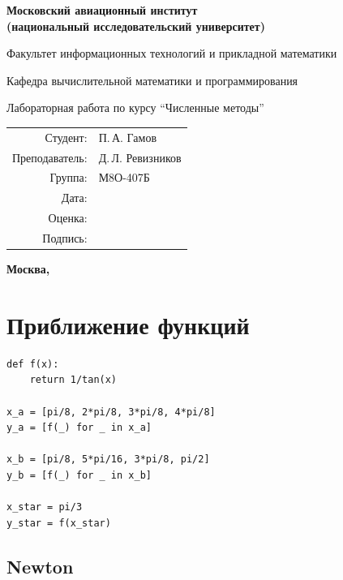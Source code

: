 \documentclass[pdf, unicode, 12pt, a4paper,oneside,fleqn]{article}
\begin{document}
\begin{titlepage}
\begin{center}
\bfseries
{\Large Московский авиационный институт\\ (национальный исследовательский университет)}

\vspace{48pt}
{\large Факультет информационных технологий и прикладной математики}

\vspace{36pt}
{\large Кафедра вычислительной математики и программирования}

\vspace{48pt}Лабораторная работа  по курсу 
\enquote{Численные методы}
\end{center}
\vspace{72pt}

\begin{flushright}
\begin{tabular}{rl}
Студент: & П.\,А. Гамов \\
Преподаватель: & Д.\,Л. Ревизников \\
Группа: & М8О-407Б \\
Дата: & \\
Оценка: & \\
Подпись: & \\
\end{tabular}
\end{flushright}
\vfill
\begin{center}
\bfseries
Москва, \the\year
\end{center}
\end{titlepage}

\pagebreak

\section{Приближение функций}

\begin{lstlisting}
def f(x):
    return 1/tan(x)
    
x_a = [pi/8, 2*pi/8, 3*pi/8, 4*pi/8]
y_a = [f(_) for _ in x_a]

x_b = [pi/8, 5*pi/16, 3*pi/8, pi/2]
y_b = [f(_) for _ in x_b]

x_star = pi/3
y_star = f(x_star)
\end{lstlisting}

\subsection{Newton}
\end{document}
